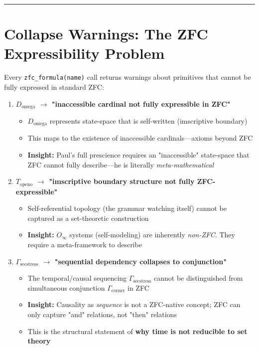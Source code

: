 \documentclass[12pt,a4paper]{article}
\begin{document}
\begin{center}
\rule{0.5\textwidth}{0.4pt}
\end{center}

\section{Collapse Warnings: The ZFC Expressibility Problem}

Every \texttt{zfc\_formula(name)} call returns warnings about primitives that cannot be fully expressed in standard ZFC:

\begin{enumerate}
    \item 
    \textbf{$D_{\text{omega}}$ $\rightarrow$ "inaccessible cardinal not fully expressible in ZFC"}

    \begin{itemize}
    \item $D_{\text{omega}}$ represents state-space that is self-written (imscriptive boundary)
    \item This maps to the existence of inaccessible cardinals---axioms beyond ZFC
    \item \textbf{Insight:} Paul's full prescience requires an "inaccessible" state-space that ZFC cannot fully describe---he is literally \emph{meta-mathematical}
\end{itemize}

    \item 
    \textbf{$T_{\text{openo}}$ $\rightarrow$ "imscriptive boundary structure not fully ZFC-expressible"}

    \begin{itemize}
    \item Self-referential topology (the grammar watching itself) cannot be captured as a set-theoretic construction
    \item \textbf{Insight:} $O_{\infty}$ systems (self-modeling) are inherently \emph{non-ZFC}. They require a meta-framework to describe
\end{itemize}

    \item 
    \textbf{$\Gamma_{\text{secstress}}$ $\rightarrow$ "sequential dependency collapses to conjunction"}

    \begin{itemize}
    \item The temporal/causal sequencing $\Gamma_{\text{secstress}}$ cannot be distinguished from simultaneous conjunction $\Gamma_{\text{corner}}$ in ZFC
    \item \textbf{Insight:} Causality as \emph{sequence} is not a ZFC-native concept; ZFC can only capture "and" relations, not "then" relations
    \item This is the structural statement of \textbf{why time is not reducible to set theory}
\end{itemize}


\end{enumerate}
\end{document}
